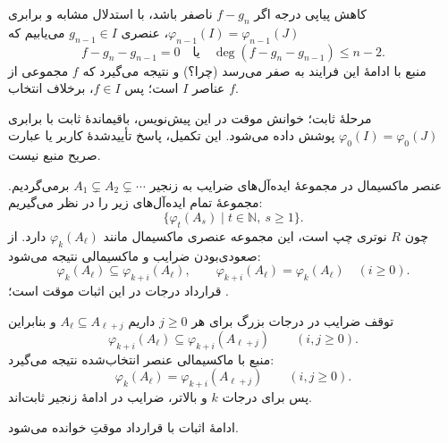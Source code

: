 \begin{frame}[t]{کاهش پیاپی درجه}
    \label{lec12:degree-reduction}
    اگر $f-g_n$ ناصفر باشد، با استدلال مشابه و برابری
    $\varphi_{n-1}(I)=\varphi_{n-1}(J)$، عنصری $g_{n-1}\in I$ می‌یابیم که
    \[
        f-g_n-g_{n-1}=0
        \quad\text{یا}\quad
        \deg(f-g_n-g_{n-1})\leq n-2.
    \]
    منبع با ادامهٔ این فرایند به صفر می‌رسد (چرا؟) و نتیجه می‌گیرد که
    $f$ مجموعی از عناصر $I$ است؛ پس $f\in I$، برخلاف انتخاب $f$.
    \begin{alertblock}{مرحلهٔ ثابت؛ خوانش موقت }
        در این پیش‌نویس، باقیماندهٔ ثابت با برابری
        $\varphi_0(I)=\varphi_0(J)$ پوشش داده می‌شود.
        این تکمیل، پاسخ تأییدشدهٔ کاربر یا عبارت صریح منبع نیست.
    \end{alertblock}
\end{frame}

\begin{frame}[t]{عنصر ماکسیمال در مجموعهٔ ایده‌آل‌های ضرایب}
    \label{lec12:maximal-coefficient-ideal}
    به زنجیر $A_1\subsetneq A_2\subsetneq\cdots$ برمی‌گردیم.
    مجموعهٔ تمام ایده‌آل‌های زیر را در نظر می‌گیریم:
    \[
        \{\varphi_t(A_s)\mid t\in\mathbb N,\ s\geq1\}.
    \]
    چون $R$ نوتری چپ است، این مجموعه عنصری ماکسیمال مانند
    $\varphi_k(A_\ell)$ دارد. از صعودی‌بودن ضرایب و ماکسیمالی نتیجه می‌شود:
    \[
        \varphi_k(A_\ell)\subseteq\varphi_{k+i}(A_\ell),
        \qquad
        \varphi_{k+i}(A_\ell)=\varphi_k(A_\ell)
        \quad(i\geq0).
    \]
    \medskip
    {\footnotesize\color{red}قرارداد درجات در این اثبات موقت است؛ .}
\end{frame}

\begin{frame}[t]{توقف ضرایب در درجات بزرگ}
    \label{lec12:high-degree-stabilization}
    برای هر $j\geq0$ داریم $A_\ell\subseteq A_{\ell+j}$ و بنابراین
    \[
        \varphi_{k+i}(A_\ell)
        \subseteq\varphi_{k+i}(A_{\ell+j})
        \qquad(i,j\geq0).
    \]
    منبع با ماکسیمالی عنصر انتخاب‌شده نتیجه می‌گیرد:
    \[
        \varphi_k(A_\ell)=\varphi_{k+i}(A_{\ell+j})
        \qquad(i,j\geq0).
    \]
    پس برای درجات $k$ و بالاتر، ضرایب در ادامهٔ زنجیر ثابت‌اند.
    \medskip

    {\footnotesize\color{red}ادامهٔ اثبات با قرارداد موقتِ  خوانده می‌شود.}
\end{frame}

